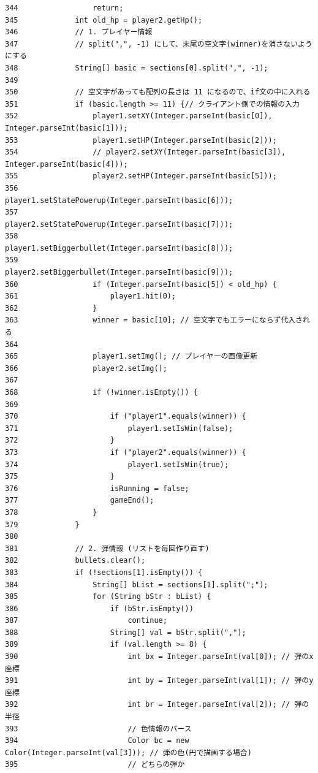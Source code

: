 \documentclass[11pt,a4j]{jarticle}
\begin{document}
\begin{small}
\begin{verbatim}
344                 return;
345             int old_hp = player2.getHp();
346             // 1. プレイヤー情報
347             // split(",", -1) にして、末尾の空文字(winner)を消さないようにする
348             String[] basic = sections[0].split(",", -1);
349 
350             // 空文字があっても配列の長さは 11 になるので、if文の中に入れる
351             if (basic.length >= 11) {// クライアント側での情報の入力
352                 player1.setXY(Integer.parseInt(basic[0]), Integer.parseInt(basic[1]));
353                 player1.setHP(Integer.parseInt(basic[2]));
354                 // player2.setXY(Integer.parseInt(basic[3]), Integer.parseInt(basic[4]));
355                 player2.setHP(Integer.parseInt(basic[5]));
356                 player1.setStatePowerup(Integer.parseInt(basic[6]));
357                 player2.setStatePowerup(Integer.parseInt(basic[7]));
358                 player1.setBiggerbullet(Integer.parseInt(basic[8]));
359                 player2.setBiggerbullet(Integer.parseInt(basic[9]));
360                 if (Integer.parseInt(basic[5]) < old_hp) {
361                     player1.hit(0);
362                 }
363                 winner = basic[10]; // 空文字でもエラーにならず代入される
364 
365                 player1.setImg(); // プレイヤーの画像更新
366                 player2.setImg();
367 
368                 if (!winner.isEmpty()) {
369 
370                     if ("player1".equals(winner)) {
371                         player1.setIsWin(false);
372                     }
373                     if ("player2".equals(winner)) {
374                         player1.setIsWin(true);
375                     }
376                     isRunning = false;
377                     gameEnd();
378                 }
379             }
380 
381             // 2. 弾情報 (リストを毎回作り直す)
382             bullets.clear();
383             if (!sections[1].isEmpty()) {
384                 String[] bList = sections[1].split(";");
385                 for (String bStr : bList) {
386                     if (bStr.isEmpty())
387                         continue;
388                     String[] val = bStr.split(",");
389                     if (val.length >= 8) {
390                         int bx = Integer.parseInt(val[0]); // 弾のx座標
391                         int by = Integer.parseInt(val[1]); // 弾のy座標
392                         int br = Integer.parseInt(val[2]); // 弾の半径
393                         // 色情報のパース
394                         Color bc = new Color(Integer.parseInt(val[3])); // 弾の色(円で描画する場合)
395                         // どちらの弾か

\end{verbatim}
\end{small}
\end{document}
